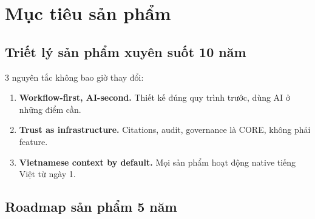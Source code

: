 \documentclass[11pt,a4paper]{article}
\begin{document}
\section{Mục tiêu sản phẩm}

\subsection{Triết lý sản phẩm xuyên suốt 10 năm}

3 nguyên tắc không bao giờ thay đổi:

\begin{enumerate}
\item \textbf{Workflow-first, AI-second.} Thiết kế đúng quy trình trước, dùng AI ở những điểm cần.
\item \textbf{Trust as infrastructure.} Citations, audit, governance là CORE, không phải feature.
\item \textbf{Vietnamese context by default.} Mọi sản phẩm hoạt động native tiếng Việt từ ngày 1.
\end{enumerate}

\subsection{Roadmap sản phẩm 5 năm}
\end{document}
